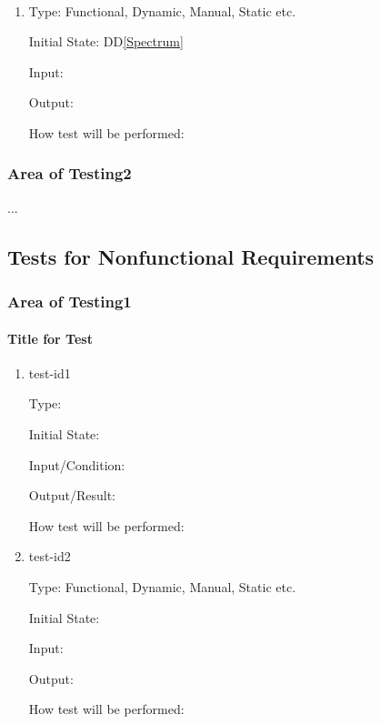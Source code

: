 \documentclass[12pt, titlepage]{article}
\newcommand{\ddref}[1]{DD\ref{#1}}
\begin{document}
\paragraph{}

\begin{enumerate}

\item{}

Type: Functional, Dynamic, Manual, Static etc.
					
Initial State: \ddref{Spectrum}
					
Input: 
					
Output: 
					
How test will be performed: 



\end{enumerate}


\subsubsection{Area of Testing2}

...

\subsection{Tests for Nonfunctional Requirements}
\label{subsec:NonfuncReqTest}

\subsubsection{Area of Testing1}
		
\paragraph{Title for Test}

\begin{enumerate}

\item{test-id1\\}

Type: 
					
Initial State: 
					
Input/Condition: 
					
Output/Result: 
					
How test will be performed: 
					
\item{test-id2\\}

Type: Functional, Dynamic, Manual, Static etc.
					
Initial State: 
					
Input: 
					
Output: 
					
How test will be performed: 

\end{enumerate}
\end{document}
